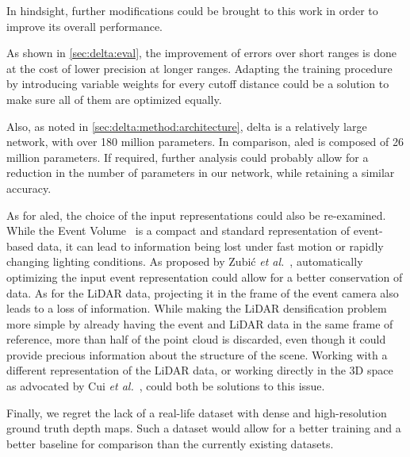 In hindsight, further modifications could be brought to this work in order to improve its overall performance.
\begin{enumerate*}[label=\textbf{(\arabic*)}]
  \item As shown in \cref{sec:delta:eval}, the improvement of errors over short ranges is done at the cost of lower precision at longer ranges. Adapting the training procedure by introducing variable weights for every cutoff distance could be a solution to make sure all of them are optimized equally.
  \item Also, as noted in \cref{sec:delta:method:architecture}, \acrshort{delta} is a relatively large network, with over 180 million parameters. In comparison, \acrshort{aled} is composed of 26 million parameters. If required, further analysis could probably allow for a reduction in the number of parameters in our network, while retaining a similar accuracy.
  \item As for \acrshort{aled}, the choice of the input representations could also be re-examined. While the Event Volume~\cite{Zhu2019UnsupervisedEL} is a compact and standard representation of event-based data, it can lead to information being lost under fast motion or rapidly changing lighting conditions. As proposed by Zubi\'c \textit{et al.}~\cite{Zubic2023FromCC}, automatically optimizing the input event representation could allow for a better conservation of data. As for the LiDAR data, projecting it in the frame of the event camera also leads to a loss of information. While making the LiDAR densification problem more simple by already having the event and LiDAR data in the same frame of reference, more than half of the point cloud is discarded, even though it could provide precious information about the structure of the scene. Working with a different representation of the LiDAR data, or working directly in the 3D space as advocated by Cui \textit{et al.}~\cite{Cui2022DenseDE}, could both be solutions to this issue.
  \item Finally, we regret the lack of a real-life dataset with dense and high-resolution ground truth depth maps. Such a dataset would allow for a better training and a better baseline for comparison than the currently existing datasets.
\end{enumerate*}

